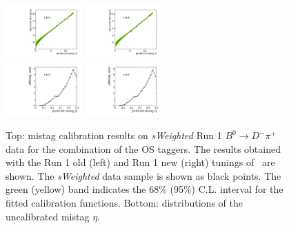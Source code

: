 \begin{figure}[ht!]
  \centering
  \includegraphics[width=0.26\textwidth]{04FlavourTagging/figs/OSelectronOpt/run1data_old/OS_Combination_Calibration.pdf}
  \includegraphics[width=0.26\textwidth]{04FlavourTagging/figs/OSelectronOpt/run1data_new/OS_Combination_Calibration.pdf} \\
  \includegraphics[width=0.26\textwidth]{04FlavourTagging/figs/OSelectronOpt/run1data_old/OS_Combination_EtaDist.pdf}
  \includegraphics[width=0.26\textwidth]{04FlavourTagging/figs/OSelectronOpt/run1data_new/OS_Combination_EtaDist.pdf} 
  \vspace{-2mm}
  \caption{Top: mistag calibration results on \emph{sWeighted} Run 1 $B^0\to D^-\pi^+$ data for the combination of the OS taggers. The results obtained with the Run 1 old (left) and Run 1 new (right) tunings of \OSe~are shown. The \emph{sWeighted} data sample is shown as black points. The green (yellow) band indicates the 68\% (95\%) C.L. interval for the fitted calibration functions. Bottom: distributions of the uncalibrated mistag $\eta$.}
  \label{fig:OSePerfCalib2}
\end{figure}

